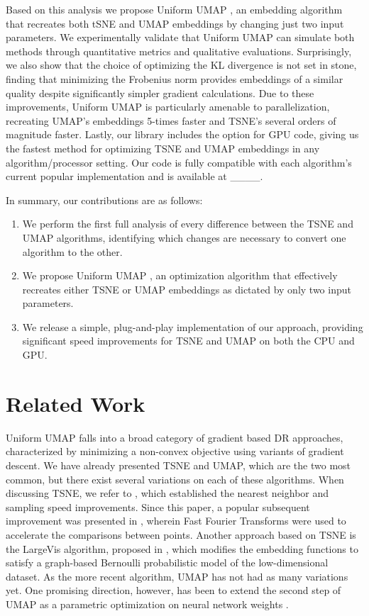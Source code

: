 \documentclass[sigconf, nonacm]{acmart}
\newcommand\ourmethod{Uniform UMAP }
\begin{document}
Based on this analysis we propose \ourmethod, an embedding algorithm that recreates both tSNE and UMAP embeddings by changing just two input parameters.
We experimentally validate that \ourmethod can simulate both methods through quantitative metrics and qualitative
evaluations. Surprisingly, we also show that the choice of optimizing the KL divergence is not set in stone, finding that minimizing the Frobenius norm provides
embeddings of a similar quality despite significantly simpler gradient calculations. Due to these improvements, \ourmethod is particularly amenable to
parallelization, recreating UMAP's embeddings 5-times faster and TSNE's several orders of magnitude faster.
Lastly, our library includes the option for GPU code, giving us the fastest method for optimizing TSNE and UMAP embeddings in any algorithm/processor setting.
Our code is fully compatible with each algorithm's current popular implementation and is available at \_\_\_\_.

In summary, our contributions are as follows:
\begin{enumerate}
        \item We perform the first full analysis of every difference between the TSNE and UMAP algorithms, identifying which changes are necessary to
        convert one algorithm to the other.
        \item We propose \ourmethod, an optimization algorithm that effectively recreates either TSNE or UMAP embeddings as dictated by only two input
            parameters.
        \item We release a simple, plug-and-play implementation of our approach, providing significant speed improvements for TSNE and UMAP on both
        the CPU and GPU.
\end{enumerate}

\section{Related Work}

\ourmethod falls into a broad category of gradient based DR approaches, characterized by minimizing a non-convex objective using variants of gradient descent.
We have already presented TSNE and UMAP, which are the two most common, but there exist several variations on each of these algorithms. When discussing TSNE, we
refer to \cite{van2014accelerating}, which established the nearest neighbor and sampling speed improvements. Since this paper, a popular subsequent improvement
was presented in \cite{linderman2019fast}, wherein Fast Fourier Transforms were used to accelerate the comparisons between points. Another approach based on
TSNE is the LargeVis algorithm, proposed in \cite{tang2016visualizing}, which modifies the embedding functions to satisfy a graph-based Bernoulli probabilistic model of
the low-dimensional dataset. As the more recent algorithm, UMAP has not had as many variations yet. One promising direction, however, has been to extend the
second step of UMAP as a parametric optimization on neural network weights \cite{sainburg2020parametric}.
\end{document}
